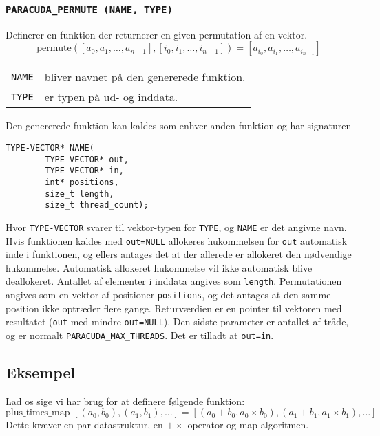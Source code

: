 \subsubsection*{\texttt{PARACUDA\_PERMUTE \scriptsize(NAME, TYPE)}}
Definerer en funktion der returnerer en given permutation af en vektor.
\[
\mbox{permute}([a_0, a_1, \ldots, a_{n-1}], [i_0, i_1, \ldots, i_{n-1}]) = [a_{i_0}, a_{i_1}, \ldots, a_{i_{n-1}}]
\]
\noindent\begin{tabular}{rp{8cm}}
\texttt{NAME} & bliver navnet på den genererede funktion. \\
\texttt{TYPE} & er typen på ud- og inddata. \\
\end{tabular}\vspace{0.2cm}

Den genererede funktion kan kaldes som enhver anden funktion og har signaturen

\begin{verbatim}
TYPE-VECTOR* NAME(
        TYPE-VECTOR* out, 
        TYPE-VECTOR* in, 
        int* positions, 
        size_t length, 
        size_t thread_count);
\end{verbatim}

Hvor \verb|TYPE-VECTOR| svarer til vektor-typen for \verb|TYPE|, og \verb|NAME| er det angivne navn. 
Hvis funktionen kaldes med \verb|out=NULL| allokeres hukommelsen 
for \verb|out| automatisk inde i funktionen, og ellers antages det at der allerede er 
allokeret den nødvendige hukommelse. Automatisk allokeret hukommelse vil ikke automatisk
blive deallokeret. Antallet af elementer i inddata angives som \verb|length|. 
Permutationen angives som en vektor af positioner \verb|positions|, og det antages at den samme
position ikke optræder flere gange.
Returværdien er en pointer til vektoren med resultatet (\verb|out| med mindre \verb|out=NULL|).
Den sidste parameter er antallet af tråde, og er normalt \verb|PARACUDA_MAX_THREADS|.
Det er tilladt at \verb|out=in|.

\subsection{Eksempel}
\label{paracuda-example}

Lad os sige vi har brug for at definere følgende funktion:
\[
\mbox{plus\_times\_map } [(a_0, b_0), (a_1, b_1), \ldots] = 
[(a_0 + b_0, a_0 \times b_0), (a_1 + b_1, a_1 \times b_1), \ldots]
\]
Dette kræver en par-datastruktur, en $+\times$-operator og map-algoritmen.

